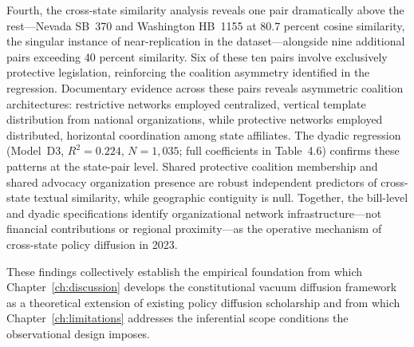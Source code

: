 Fourth, the cross-state similarity analysis reveals one pair dramatically above the rest---Nevada SB~370 and Washington HB~1155 at 80.7 percent cosine similarity, the singular instance of near-replication in the dataset---alongside nine additional pairs exceeding 40 percent similarity. Six of these ten pairs involve exclusively protective legislation, reinforcing the coalition asymmetry identified in the regression. Documentary evidence across these pairs reveals asymmetric coalition architectures: restrictive networks employed centralized, vertical template distribution from national organizations, while protective networks employed distributed, horizontal coordination among state affiliates. The dyadic regression (Model~D3, $R^2 = 0.224$, $N = 1{,}035$; full coefficients in Table~4.6) confirms these patterns at the state-pair level. Shared protective coalition membership and shared advocacy organization presence are robust independent predictors of cross-state textual similarity, while geographic contiguity is null. Together, the bill-level and dyadic specifications identify organizational network infrastructure---not financial contributions or regional proximity---as the operative mechanism of cross-state policy diffusion in 2023.

These findings collectively establish the empirical foundation from which Chapter~\ref{ch:discussion} develops the constitutional vacuum diffusion framework as a theoretical extension of existing policy diffusion scholarship and from which Chapter~\ref{ch:limitations} addresses the inferential scope conditions the observational design imposes.